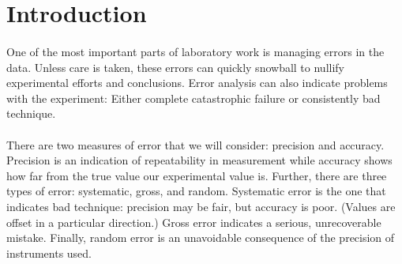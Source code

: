 \documentclass[fleqn,titlepage]{article}
\begin{document}
\section*{Introduction}
  \paragraph{} One of the most important parts of laboratory work is managing errors in the data. Unless care is taken, these errors can quickly snowball to nullify experimental efforts and conclusions. Error analysis can also indicate problems with the experiment: Either complete catastrophic failure or consistently bad technique.
  \paragraph{} There are two measures of error that we will consider: precision and accuracy. Precision is an indication of repeatability in measurement while accuracy shows how far from the true value our experimental value is. Further, there are three types of error: systematic, gross, and random. Systematic error is the one that indicates bad technique: precision may be fair, but accuracy is poor. (Values are offset in a particular direction.)
  Gross error indicates a serious, unrecoverable mistake. Finally, random error is an unavoidable consequence of the precision of instruments used.
\end{document}
